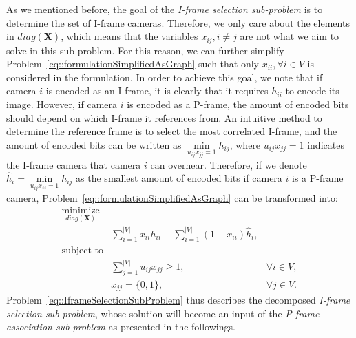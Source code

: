 As we mentioned before, the goal of the \emph{I-frame selection sub-problem} is to determine the set of I-frame cameras.
Therefore, we only care about the elements in $diag(\mathbf{X})$, which means that the variables $x_{ij}, i \neq j$ are not what we aim to solve in this sub-problem.
For this reason, we can further simplify Problem~\eqref{eq::formulationSimplifiedAsGraph} such that only $x_{ii}, \forall i \in V$ is considered in the formulation.
In order to achieve this goal, we note that if camera $i$ is encoded as an I-frame, it is clearly that it requires $h_{ii}$ to encode its image.
However, if camera $i$ is encoded as a P-frame, the amount of encoded bits should depend on which I-frame it references from.
An intuitive method to determine the reference frame is to select the most correlated I-frame, and the amount of encoded bits can be written as $\underset{u_{ij}x_{jj} = 1}{\min} h_{ij}$, where $u_{ij}x_{jj} = 1$ indicates the I-frame camera that camera $i$ can overhear.
Therefore, if we denote ${\hat{h}_i = \underset{u_{ij}x_{jj} = 1}{\min} h_{ij}}$ as the smallest amount of encoded bits if camera $i$ is a P-frame camera, Problem~\eqref{eq::formulationSimplifiedAsGraph} can be transformed into:
\begin{align}
\underset{diag(\mathbf{X})}{\text{minimize}} & & \nonumber \\
	&\sum_{i=1}^{|V|} x_{ii}h_{ii} + \sum_{i=1}^{|V|} (1-x_{ii}) \hat{h}_i, & \nonumber \\
\text{subject to} & & \nonumber \\
	&\sum_{j=1}^{|V|} u_{ij} x_{jj} \geq 1, &\forall i \in V, \nonumber \\
	&x_{jj} = \{0,1\}, &\forall j \in V.  
\label{eq::IframeSelectionSubProblem}
\end{align}
Problem~\eqref{eq::IframeSelectionSubProblem} thus describes the decomposed \emph{I-frame selection sub-problem}, whose solution will become an input of the \emph{P-frame association sub-problem} as presented in the followings.
%



%
